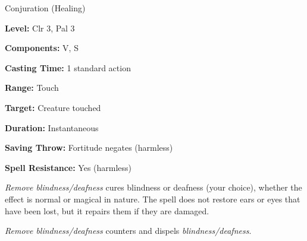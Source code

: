 \label{spell:Remove Blindness}\label{spell:Remove Deafness}

Conjuration (Healing)

\textbf{Level:} Clr 3, Pal 3

\textbf{Components:} V, S

\textbf{Casting Time:} 1 standard action

\textbf{Range:} Touch

\textbf{Target:} Creature touched

\textbf{Duration:} Instantaneous

\textbf{Saving Throw:} Fortitude negates (harmless)

\textbf{Spell Resistance:} Yes (harmless)

\textit{Remove blindness/deafness} cures blindness or deafness (your choice), whether 
the effect is normal or magical in nature. The spell does not restore ears or eyes 
that have been lost, but it repairs them if they are damaged.

\textit{Remove blindness/deafness} counters and dispels \textit{blindness/deafness}.

